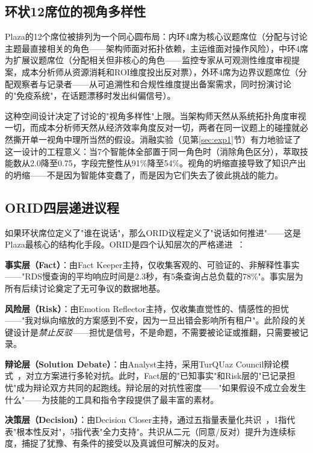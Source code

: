 \documentclass[12pt,a4paper]{ctexart}
\begin{document}
\subsection{环状12席位的视角多样性}

Plaza的12个席位被排列为一个同心圆布局：内环4席为核心议题席位（分配与讨论主题最直接相关的角色——架构师面对拓扑依赖，主运维面对操作风险），中环4席为扩展议题席位（分配相关但非核心的角色——监控专家从可观测性维度审视提案，成本分析师从资源消耗和ROI维度投出反对票），外环4席为边界议题席位（分配观察者与记录者——从可追溯性和合规性维度提出备案需求，同时扮演讨论的"免疫系统"，在话题漂移时发出纠偏信号）。

这种空间设计决定了讨论的"视角多样性"上限。当架构师天然从系统拓扑角度审视一切，而成本分析师天然从经济效率角度反对一切，两者在同一议题上的碰撞就必然撕开单一视角中理所当然的假设。消融实验（见第\ref{sec:exp1}节）有力地验证了这一设计的工程意义：当7个智能体全部置于同一角色时（消除角色区分），萃取技能数从2.0降至0.75，字段完整性从91\%降至54\%。视角的坍缩直接导致了知识产出的坍缩——不是因为智能体变蠢了，而是因为它们失去了彼此挑战的能力。

\subsection{ORID四层递进议程}

如果环状席位定义了"谁在说话"，那么ORID议程定义了"说话如何推进"——这是Plaza最核心的结构化手段。ORID是四个认知层次的严格递进~\cite{kaner2014facilitator}：

\textbf{事实层（Fact）}：由Fact Keeper主持，仅收集客观的、可验证的、非解释性事实——"RDS慢查询的平均响应时间是2.3秒，有5条查询占总负载的78\%"。事实层为所有后续讨论奠定了无可争议的数据地基。

\textbf{风险层（Risk）}：由Emotion Reflector主持，仅收集直觉性的、情感性的担忧——"我对纵向缩放的方案感到不安，因为一旦出错会影响所有租户"。此阶段的关键设计是\emph{禁止反驳}——担忧是信号，不是命题，不需要被论证或推翻，只需要被记录。

\textbf{辩论层（Solution Debate）}：由Analyst主持，采用TurQUaz Council辩论模式~\cite{gungor2025turquaz}，对立方案进行多轮对抗。此时，Fact层的"已知事实"和Risk层的"已记录担忧"成为辩论双方共同的起跑线。辩论层的对抗性密度——"如果假设不成立会发生什么"——为技能的工具和指令字段提供了最丰富的素材。

\textbf{决策层（Decision）}：由Decision Closer主持，通过五指量表量化共识~\cite{lippincott2025fuzzy}，1指代表"根本性反对"，5指代表"全力支持"。共识从二元（同意/反对）提升为连续标度，捕捉了犹豫、有条件的接受以及真诚但可解决的反对。
\end{document}
